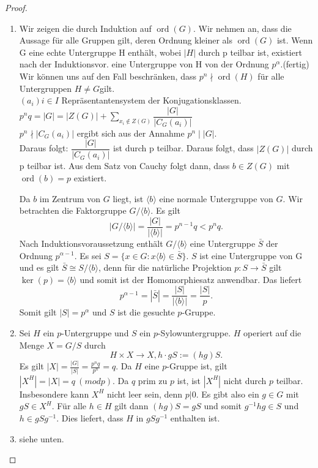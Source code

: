 \documentclass[12pt]{scrartcl} %
\DeclareMathOperator{\ord}{ord}
\theoremstyle{definition}
\theoremstyle{remark}
\begin{document}
\begin{proof}
\begin{enumerate}
\item Wir zeigen die durch Induktion auf $\ord(G)$.
Wir nehmen an, dass die Aussage für alle Gruppen gilt, deren Ordnung kleiner als \(\ord(G)\) ist.
Wenn G eine echte Untergruppe H enthält, wobei $|H|$ durch p teilbar ist, existiert nach der Induktionsvor. eine Untergruppe von H von der Ordnung $p^\alpha$.(fertig) \\
Wir können uns auf den Fall beschränken, dass $p^n \nmid \ord(H)$ für alle Untergruppen $H\neq G$gilt. \\
$(a_{i}){i \in I}$ Repräsentantensystem der Konjugationsklassen. \\
$p^n q=|G|=|Z(G)|+\sum_{x_{i}\notin Z(G)}\dfrac{|G|}{|C_{G}(a_{i})|}$ \\
$p^n \nmid |C_{G}(a_{i})|$ ergibt sich aus der Annahme $p^n \mid |G|$. \\
Daraus folgt: $\dfrac{|G|}{|C_{G}(a_{i})|}$ ist durch p teilbar. Daraus folgt, dass $|Z(G)|$ durch p teilbar ist. Aus dem Satz von Cauchy folgt dann, dass $b \in Z(G)$ mit $\ord(b)=p$ existiert.

Da $b$ im Zentrum von $G$ liegt, ist $\langle b \rangle$ eine normale Untergruppe von $G$. Wir betrachten die Faktorgruppe $G/ \langle b \rangle$. Es gilt
	$$ |G/ \langle b \rangle | = \frac{|G|}{| \langle b \rangle |} = p^{n-1}q < p^nq. $$
	Nach Induktionsvoraussetzung enthält $G / \langle b \rangle$ eine Untergruppe $\bar{S}$ der Ordnung $p^{\alpha - 1}$. Es sei $S = \{ x \in G : x \langle b \rangle \in \bar{S} \}$. $S$ ist eine Untergruppe von G und es gilt $ \bar{S} \cong S/ \langle b \rangle$, denn für die natürliche Projektion $p: S \rightarrow \bar{S}$ gilt $\ker(p) = \langle b \rangle$ und somit ist der Homomorphiesatz anwendbar.
	Das liefert
	$$ p^{\alpha - 1} = |\bar{S}| = \frac{|S|}{| \langle b \rangle |} = \frac{|S|}{p}. $$
	Somit gilt $|S| = p^{\alpha}$ und $S$ ist die gesuchte $p$-Gruppe.
	
	\item Sei $H$ ein $p$-Untergruppe und $S$ ein $p$-Sylowuntergruppe. $H$ operiert auf die Menge $X = G/S$ durch
	$$ H \times X \rightarrow X, h \cdot gS := (hg)S.$$
	Es gilt $|X| = \frac{|G|}{|S|} = \frac{p^nq}{p^n} = q$. Da $H$ eine $p$-Gruppe ist, gilt $|X^H| = |X| = q \ (modp)$. Da $q$ prim zu $p$ ist, ist $|X^H|$ nicht durch $p$ teilbar. Insbesondere kann $X^H$ nicht leer sein, denn $p|0$. Es gibt also ein $g \in G$ mit $gS \in X^H$. Für alle $h \in H$ gilt dann $(hg)S = gS$ und somit $g^{-1}hg \in S$ und $h \in gSg^{-1}$. Dies liefert, dass $H$ in $gSg^{-1}$ enthalten ist.
	
	\item siehe unten.
\end{enumerate}
\end{proof}
\end{document}
